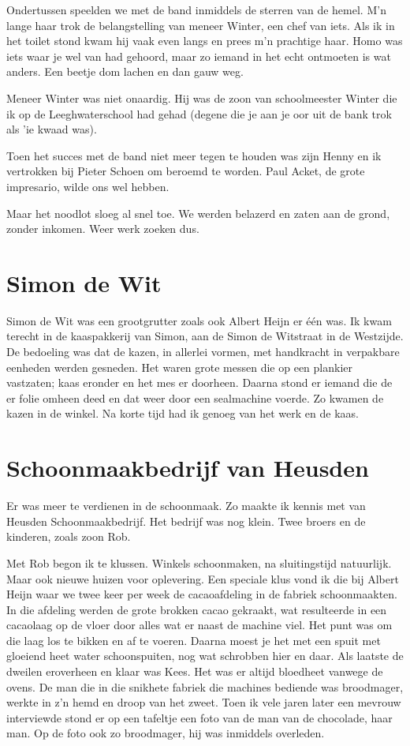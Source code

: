 \documentclass[12pt,twoside, openright]{memoir}
\begin{document}
Ondertussen speelden we met de band inmiddels de sterren van de hemel. M’n lange haar trok de belangstelling van meneer Winter, een chef van iets. Als ik in het toilet stond kwam hij vaak even langs en prees m’n prachtige haar. Homo was iets waar je wel van had gehoord, maar zo iemand in het echt ontmoeten is wat anders. Een beetje dom lachen en dan gauw weg. 

Meneer Winter was niet onaardig. Hij was de zoon van schoolmeester Winter die ik op de Leeghwaterschool had gehad (degene die je aan je oor uit de bank trok als 'ie kwaad was). 

Toen het succes met de band niet meer tegen te houden was zijn Henny en ik vertrokken bij Pieter Schoen om beroemd te worden. Paul Acket, de grote impresario, wilde ons wel hebben.

Maar het noodlot sloeg al snel toe. We werden belazerd en zaten aan de grond, zonder inkomen. Weer werk zoeken dus.

\section*{Simon de Wit} %
\label{cha:wit}

Simon de Wit was een grootgrutter zoals ook Albert Heijn er één was. Ik kwam terecht in de kaaspakkerij van Simon, aan de Simon de Witstraat in de Westzijde. De bedoeling was dat de kazen, in allerlei vormen, met handkracht in verpakbare eenheden werden gesneden. Het waren grote messen die op een plankier vastzaten; kaas eronder en het mes er doorheen. Daarna stond er iemand die de er folie omheen deed en dat weer door een sealmachine voerde. Zo kwamen de kazen in de winkel. Na korte tijd had ik genoeg van het werk en de kaas.

\section*{Schoonmaakbedrijf van Heusden} %
\label{cha:schoonmaakbedrijf}

Er was meer te verdienen in de schoonmaak. Zo maakte ik kennis met van Heusden Schoonmaakbedrijf. Het bedrijf was nog klein. Twee broers en de kinderen, zoals zoon Rob. 

Met Rob begon ik te klussen. Winkels schoonmaken, na sluitingstijd natuurlijk. Maar ook nieuwe huizen voor oplevering. Een speciale klus vond ik die bij Albert Heijn waar we twee keer per week de cacaoafdeling in de fabriek schoonmaakten. In die afdeling werden de grote brokken cacao gekraakt, wat resulteerde in een cacaolaag op de vloer door alles wat er naast de machine viel. Het punt was om die laag los te bikken en af te voeren. Daarna moest je het met een spuit met gloeiend heet water schoonspuiten, nog wat schrobben hier en daar. Als laatste de dweilen eroverheen en klaar was Kees. Het was er altijd bloedheet vanwege de ovens. De man die in die snikhete fabriek die machines bediende was broodmager, werkte in z’n hemd en droop van het zweet. Toen ik vele jaren later een mevrouw interviewde stond er op een tafeltje een foto van de man van de chocolade, haar man. Op de foto ook zo broodmager, hij was inmiddels overleden.
\end{document}
